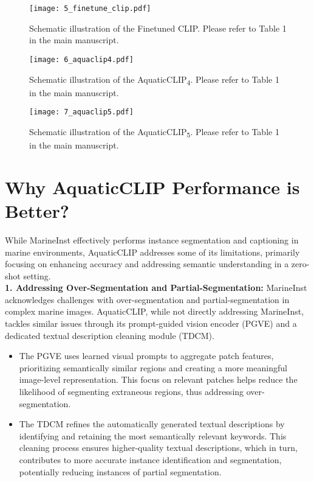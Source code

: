 \begin{figure*}[t!]
\centering
\texttt{[image: 5\_finetune\_clip.pdf]}
\caption{Schematic illustration of the Finetuned CLIP. Please refer to Table 1 in the main manuscript.}
\label{fig:finetune_clip}
\end{figure*}

\begin{figure*}[t!]
\centering
\texttt{[image: 6\_aquaclip4.pdf]}
\caption{Schematic illustration of the AquaticCLIP\textsubscript{4}. Please refer to Table 1 in the main manuscript.}
\label{fig:aquatic_clip4}
\end{figure*}

\begin{figure*}[t!]
\centering
\texttt{[image: 7\_aquaclip5.pdf]}
\caption{Schematic illustration of the AquaticCLIP\textsubscript{5}. Please refer to Table 1 in the main manuscript.}
\label{fig:aquatic_clip5}
\end{figure*}




\section{Why AquaticCLIP Performance is Better?}
\label{discussion}
While MarineInst \cite{ziqiang2024marineinst} effectively performs instance segmentation and captioning in marine environments, AquaticCLIP addresses some of its limitations, primarily focusing on enhancing accuracy and addressing semantic understanding in a zero-shot setting. \\

\textbf{1. Addressing Over-Segmentation and Partial-Segmentation:} MarineInst acknowledges challenges with over-segmentation and partial-segmentation in complex marine images. 
AquaticCLIP, while not directly addressing MarineInst, tackles similar issues through its prompt-guided vision encoder (PGVE) and a dedicated textual description cleaning module (TDCM).

\begin{itemize}
\item The PGVE uses learned visual prompts to aggregate patch features, prioritizing semantically similar regions and creating a more meaningful image-level representation. 
This focus on relevant patches helps reduce the likelihood of segmenting extraneous regions, thus addressing over-segmentation.
\item  The TDCM refines the automatically generated textual descriptions by identifying and retaining the most semantically relevant keywords. This cleaning process ensures higher-quality textual descriptions, which in turn, contributes to more accurate instance identification and segmentation, potentially reducing instances of partial segmentation.
\end{itemize}
    

